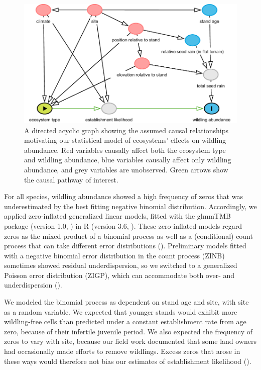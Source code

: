 \documentclass[
]{article}
\begin{document}
\begin{figure}
\includegraphics[width=0.9\linewidth]{figures/dagitty-model} \caption{A directed acyclic graph showing the assumed causal relationships motivating our statistical model of ecosystems' effects on wildling abundance. Red variables causally affect both the ecosystem type and wildling abundance, blue variables causally affect only wildling abundance, and grey variables are unobserved. Green arrows show the causal pathway of interest.}\label{fig:DAG}
\end{figure}

For all species, wildling abundance showed a high frequency of zeros that was
underestimated by the best fitting negative binomial distribution. Accordingly,
we applied zero-inflated generalized linear models, fitted with the glmmTMB
package (version 1.0, ) in R (version 3.6, ). These zero-inflated models regard
zeros as the mixed product of a binomial process as well as a (conditional)
count process that can take different error distributions
(). Preliminary models fitted with a negative
binomial error distribution in the count process (ZINB) sometimes showed
residual underdispersion, so we switched to a generalized Poisson error
distribution (ZIGP), which can accommodate both over- and underdispersion
().

We modeled the binomial process as dependent on stand age and site, with site as
a random variable. We expected that younger stands would exhibit more
wildling-free cells than predicted under a constant establishment rate from age
zero, because of their infertile juvenile period. We also expected the frequency
of zeros to vary with site, because our field work documented that some land
owners had occasionally made efforts to remove wildlings. Excess zeros that
arose in these ways would therefore not bias our estimates of establishment
likelihood ().
\end{document}
